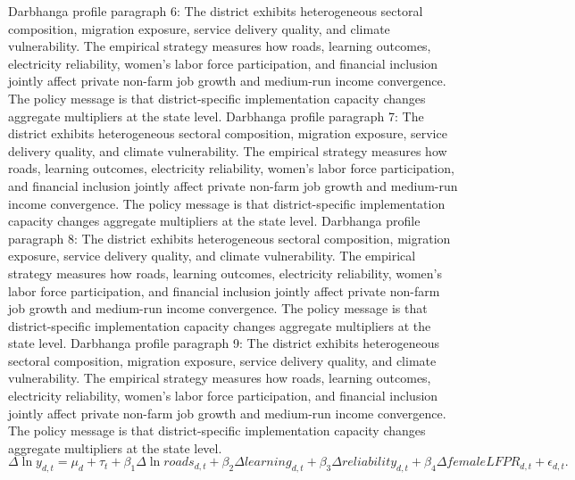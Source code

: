 \documentclass[preprint,12pt]{elsarticle}
\begin{document}
Darbhanga profile paragraph 6: The district exhibits heterogeneous sectoral composition, migration exposure, service delivery quality, and climate vulnerability. The empirical strategy measures how roads, learning outcomes, electricity reliability, women's labor force participation, and financial inclusion jointly affect private non-farm job growth and medium-run income convergence. The policy message is that district-specific implementation capacity changes aggregate multipliers at the state level.
Darbhanga profile paragraph 7: The district exhibits heterogeneous sectoral composition, migration exposure, service delivery quality, and climate vulnerability. The empirical strategy measures how roads, learning outcomes, electricity reliability, women's labor force participation, and financial inclusion jointly affect private non-farm job growth and medium-run income convergence. The policy message is that district-specific implementation capacity changes aggregate multipliers at the state level.
Darbhanga profile paragraph 8: The district exhibits heterogeneous sectoral composition, migration exposure, service delivery quality, and climate vulnerability. The empirical strategy measures how roads, learning outcomes, electricity reliability, women's labor force participation, and financial inclusion jointly affect private non-farm job growth and medium-run income convergence. The policy message is that district-specific implementation capacity changes aggregate multipliers at the state level.
Darbhanga profile paragraph 9: The district exhibits heterogeneous sectoral composition, migration exposure, service delivery quality, and climate vulnerability. The empirical strategy measures how roads, learning outcomes, electricity reliability, women's labor force participation, and financial inclusion jointly affect private non-farm job growth and medium-run income convergence. The policy message is that district-specific implementation capacity changes aggregate multipliers at the state level.
\begin{equation}\Delta \ln y_{d,t}=\mu_d+\tau_t+\beta_1\Delta\ln roads_{d,t}+\beta_2\Delta learning_{d,t}+\beta_3\Delta reliability_{d,t}+\beta_4\Delta femaleLFPR_{d,t}+\epsilon_{d,t}.\end{equation}
\end{document}
